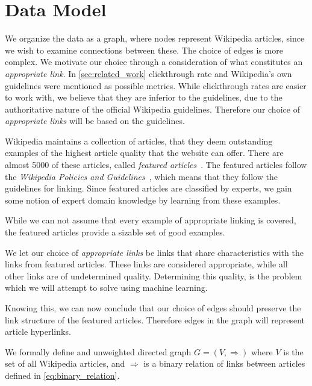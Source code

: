 \section{Data Model}\label{sec:choice_of_graph}
We organize the data as a graph, where nodes represent Wikipedia articles, since we wish to examine connections between these. The choice of edges is more complex. We motivate our choice through a consideration of what constitutes an \emph{appropriate link}. In \cref{sec:related_work} clickthrough rate and Wikipedia's own guidelines were mentioned as possible metrics. While clickthrough rates are easier to work with, we believe that they are inferior to the guidelines, due to the authoritative nature of the official Wikipedia guidelines. Therefore our choice of \emph{appropriate links} will be based on the guidelines.

Wikipedia maintains a collection of articles, that they deem outstanding examples of the highest article quality that the website can offer. There are almost 5000 of these articles, called \emph{featured articles}~\cite{wiki-featured-articles}. The featured articles follow the \emph{Wikipedia Policies and Guidelines}~\cite{wiki-editor-guidelines}, which means that they follow the guidelines for linking. Since featured articles are classified by experts, we gain some notion of expert domain knowledge by learning from these examples.

While we can not assume that every example of appropriate linking is covered, the featured articles provide a sizable set of good examples. 

We let our choice of \emph{appropriate links} be links that share characteristics with the links from featured articles. These links are considered appropriate, while all other links are of undetermined quality. Determining this quality, is the problem which we will attempt to solve using machine learning. 

Knowing this, we can now conclude that our choice of edges should preserve the link structure of the featured articles. Therefore edges in the graph will represent article hyperlinks. 

We formally define and unweighted directed graph $G = (V,\Rightarrow)$ where $V$ is the set of all Wikipedia articles, and $\Rightarrow$ is a binary relation of links between articles defined in \cref{eq:binary_relation}.

